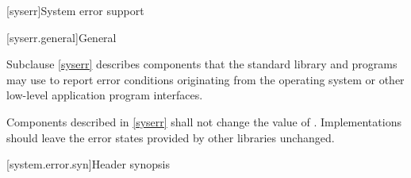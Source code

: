 [syserr]{System error support}

[syserr.general]{General}

\pnum
Subclause \ref{syserr} describes components that the standard library and
\Cpp{} programs may use to report error conditions originating from
the operating system or other low-level application program interfaces.

\pnum
Components described in \ref{syserr} shall not change the value of
.
Implementations should leave the error states provided by other
libraries unchanged.

[system.error.syn]{Header  synopsis}

%
%
%
%
%
%
%
%
